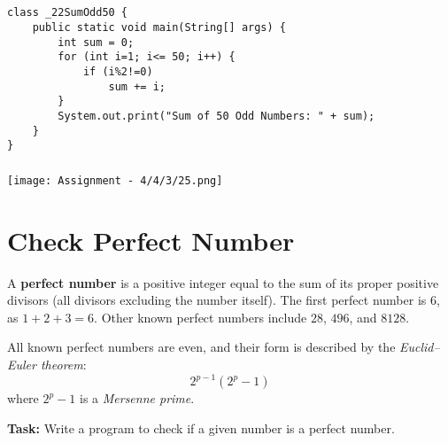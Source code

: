 \documentclass[12pt,a4paper]{article}
\begin{document}
\subsection{}
\begin{lstlisting}
class _22SumOdd50 {
    public static void main(String[] args) {
        int sum = 0;
        for (int i=1; i<= 50; i++) {
            if (i%2!=0)
                sum += i;
        }
        System.out.print("Sum of 50 Odd Numbers: " + sum);
    }
}
\end{lstlisting}

\subsubsection{}
\begin{center}
    \texttt{[image: Assignment - 4/4/3/25.png]}
\end{center}


\section{Check Perfect Number}
A \textbf{perfect number} is a positive integer equal to the sum of its proper positive divisors (all divisors excluding the number itself). The first perfect number is $6$, as $1 + 2 + 3 = 6$. Other known perfect numbers include $28$, $496$, and $8128$. 

All known perfect numbers are even, and their form is described by the \textit{Euclid--Euler theorem}:
\[
2^{p-1} (2^p - 1)
\]
where $2^p - 1$ is a \textit{Mersenne prime}.

\textbf{Task:} Write a program to check if a given number is a perfect number.
\end{document}

